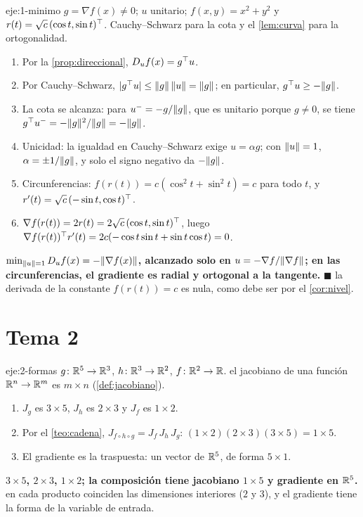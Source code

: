 \begin{solucion}{eje:1-minimo}
\datos $g=\nabla f(x)\ne 0$; $u$ unitario; $f(x,y)=x^{2}+y^{2}$ y $r(t)=\sqrt c\,(\cos t,\sin t)^{\top}$.
\planteamiento Cauchy--Schwarz para la cota y el \cref{lem:curva} para la ortogonalidad.
\pasos
\begin{enumerate}[label=\arabic*.]
  \item Por la \cref{prop:direccional}, $D_uf(x)=g^{\top} u$.
  \item Por Cauchy--Schwarz, $\lvert g^{\top} u\rvert\le\lVert g\rVert\,\lVert u\rVert=\lVert g\rVert$; en particular, $g^{\top} u\ge-\lVert g\rVert$.
  \item La cota se alcanza: para $u^{-}=-g/\lVert g\rVert$, que es unitario porque $g\ne 0$, se tiene $g^{\top} u^{-}=-\lVert g\rVert^{2}/\lVert g\rVert=-\lVert g\rVert$.
  \item Unicidad: la igualdad en Cauchy--Schwarz exige $u=\alpha g$; con $\lVert u\rVert=1$, $\alpha=\pm1/\lVert g\rVert$, y solo el signo negativo da $-\lVert g\rVert$.
  \item Circunferencias: $f(r(t))=c(\cos^{2}t+\sin^{2}t)=c$ para todo $t$, y $r'(t)=\sqrt c\,(-\sin t,\cos t)^{\top}$.
  \item $\nabla f(r(t))=2r(t)=2\sqrt c\,(\cos t,\sin t)^{\top}$, luego $\nabla f(r(t))^{\top} r'(t)=2c(-\cos t\sin t+\sin t\cos t)=0$.
\end{enumerate}
\resultado \textbf{$\min_{\lVert u\rVert=1}D_uf(x)=-\lVert\nabla f(x)\rVert$, alcanzado solo en $u=-\nabla f/\lVert\nabla f\rVert$; en las circunferencias, el gradiente es radial y ortogonal a la tangente.} $\blacksquare$
\comprobacion la derivada de la constante $f(r(t))=c$ es nula, como debe ser por el \cref{cor:nivel}.
\end{solucion}

\section{Tema 2}

\begin{solucion}{eje:2-formas}
\datos $g\colon\mathbb{R}^{5}\to\mathbb{R}^{3}$, $h\colon\mathbb{R}^{3}\to\mathbb{R}^{2}$, $f\colon\mathbb{R}^{2}\to\mathbb{R}$.
\planteamiento el jacobiano de una función $\mathbb{R}^{n}\to\mathbb{R}^{m}$ es $m\times n$ (\cref{def:jacobiano}).
\pasos
\begin{enumerate}[label=\arabic*.]
  \item $J_g$ es $3\times 5$, $J_h$ es $2\times 3$ y $J_f$ es $1\times 2$.
  \item Por el \cref{teo:cadena}, $J_{f\circ h\circ g}=J_f\,J_h\,J_g$: $(1\times 2)(2\times 3)(3\times 5)=1\times 5$.
  \item El gradiente es la traspuesta: un vector de $\mathbb{R}^{5}$, de forma $5\times 1$.
\end{enumerate}
\resultado \textbf{$3\times 5$, $2\times 3$, $1\times 2$; la composición tiene jacobiano $1\times 5$ y gradiente en $\mathbb{R}^{5}$.}
\comprobacion en cada producto coinciden las dimensiones interiores ($2$ y $3$), y el gradiente tiene la forma de la variable de entrada.
\end{solucion}

